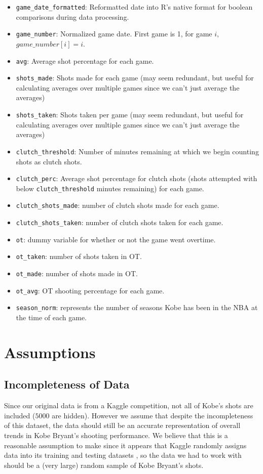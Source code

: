 \documentclass[paper=a4, fontsize=11pt]{scrartcl} %
\numberwithin{equation}{section} %
\numberwithin{figure}{section} %
\numberwithin{table}{section} %
\begin{document}
\begin{itemize}
	\item \texttt{game\_date\_formatted}: Reformatted date into R's native format for boolean comparisons during data processing. 
	\item \texttt{game\_number}: Normalized game date. First game is 1, for game $i$, $game\_number[i] = i$.
	\item \texttt{avg}: Average shot percentage for each game.
	\item \texttt{shots\_made}: Shots made for each game (may seem redundant, but useful for calculating averages over multiple games since we can't just average the averages)
	\item \texttt{shots\_taken}: Shots taken per game (may seem redundant, but useful for calculating averages over multiple games since we can't just average the averages)
	\item \texttt{clutch\_threshold}: Number of minutes remaining at which we begin counting shots as clutch shots.
	\item \texttt{clutch\_perc}: Average shot percentage for clutch shots (shots attempted with below \texttt{clutch\_threshold} minutes remaining) for each game.
	\item \texttt{clutch\_shots\_made}: number of clutch shots made for each game.
	\item \texttt{clutch\_shots\_taken}: number of clutch shots taken for each game. 
	\item \texttt{ot}: dummy variable for whether or not the game went overtime.
	\item \texttt{ot\_taken}: number of shots taken in OT.
	\item \texttt{ot\_made}: number of shots made in OT.
	\item \texttt{ot\_avg}: OT shooting percentage for each game.
	\item \texttt{season\_norm}: represents the number of seasons Kobe has been in the NBA at the time of each game.
	\end{itemize}
\section{Assumptions}
\subsection{Incompleteness of Data}
\hspace*{1cm}Since our original data is from a Kaggle competition, not all of Kobe's shots are included ($5000$ are hidden). However we assume that despite the incompleteness of this dataset, the data should still be an accurate representation of overall trends in Kobe Bryant's shooting performance. We believe that this is a reasonable assumption to make since it appears that Kaggle randomly assigns data into its training and testing datasets \cite{forumpost}, so the data we had to work with should be a (very large) random sample of Kobe Bryant's shots.
\end{document}

